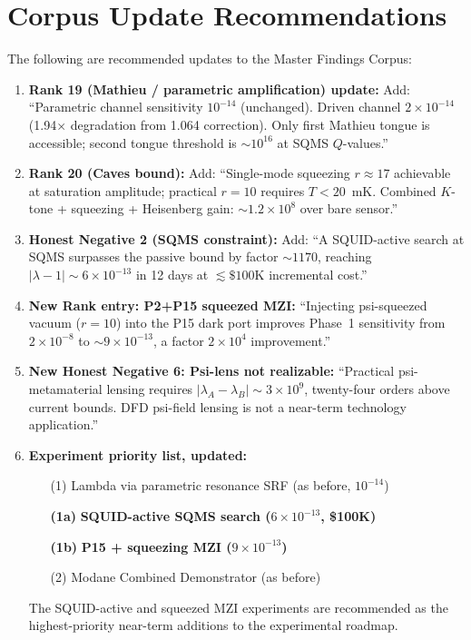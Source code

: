 \documentclass[11pt,twocolumn]{article}
\newcommand{\lam}{\lambda}
\begin{document}
\section{Corpus Update Recommendations}
\label{sec:corpus_updates}

The following are recommended updates to the Master Findings Corpus:

\begin{enumerate}
\item \textbf{Rank 19 (Mathieu / parametric amplification) update:}
Add: ``Parametric channel sensitivity $10^{-14}$ (unchanged). Driven
channel $2\times10^{-14}$ (1.94$\times$ degradation from 1.064
correction). Only first Mathieu tongue is accessible; second tongue
threshold is $\sim 10^{16}$ at SQMS $Q$-values.''

\item \textbf{Rank 20 (Caves bound):}
Add: ``Single-mode squeezing $r \approx 17$ achievable at saturation
amplitude; practical $r = 10$ requires $T < 20$~mK. Combined
$K$-tone + squeezing + Heisenberg gain: $\sim 1.2\times10^8$ over
bare sensor.''

\item \textbf{Honest Negative 2 (SQMS constraint):}
Add: ``A SQUID-active search at SQMS surpasses the passive bound by
factor $\sim 1170$, reaching $|\lam-1| \sim 6\times10^{-13}$ in
12 days at $\lesssim\$100$K incremental cost.''

\item \textbf{New Rank entry: P2+P15 squeezed MZI:}
``Injecting psi-squeezed vacuum ($r = 10$) into the P15 dark port
improves Phase~1 sensitivity from $2\times10^{-8}$ to $\sim
9\times10^{-13}$, a factor $2\times10^4$ improvement.''

\item \textbf{New Honest Negative 6: Psi-lens not realizable:}
``Practical psi-metamaterial lensing requires $|\lam_A - \lam_B|
\sim 3\times10^9$, twenty-four orders above current bounds. DFD
psi-field lensing is not a near-term technology application.''

\item \textbf{Experiment priority list, updated:}
\begin{enumerate}[nosep]
\item[(1)] Lambda via parametric resonance SRF (as before, $10^{-14}$)
\item[\textbf{(1a)}] \textbf{SQUID-active SQMS search ($6\times10^{-13}$, \$100K)}
\item[\textbf{(1b)}] \textbf{P15 + squeezing MZI ($9\times10^{-13}$)}
\item[(2)] Modane Combined Demonstrator (as before)
\end{enumerate}
The SQUID-active and squeezed MZI experiments are recommended as
the highest-priority near-term additions to the experimental roadmap.
\end{enumerate}
\end{document}
